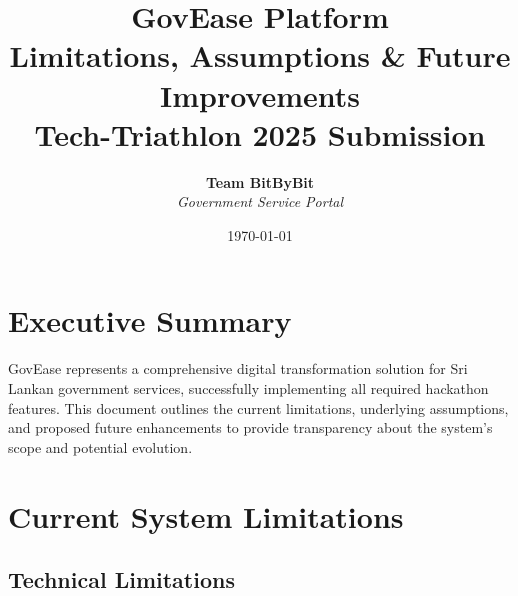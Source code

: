 \documentclass[11pt,a4paper]{article}
\title{\Huge\textbf{GovEase Platform} \\ \Large Limitations, Assumptions \& Future Improvements \\ \normalsize Tech-Triathlon 2025 Submission}
\author{\textbf{Team BitByBit} \\ \textit{Government Service Portal}}
\date{\today}
\begin{document}
\maketitle
\thispagestyle{fancy}

\vspace{0.5cm}

\section{Executive Summary}

GovEase represents a comprehensive digital transformation solution for Sri Lankan government services, successfully implementing all required hackathon features. This document outlines the current limitations, underlying assumptions, and proposed future enhancements to provide transparency about the system's scope and potential evolution.

\section{Current System Limitations}

\subsection{Technical Limitations}
\end{document}
